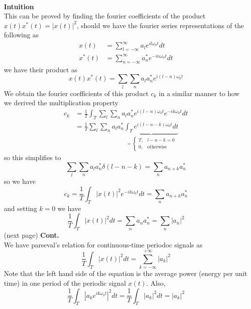 \documentclass{report}
\begin{document}
\vspace{1mm}\\
\textbf{Intuition}\\
This can be proved by finding the fourier coefficients of the product $x(t)x^*(t)=|x(t)|^2$, should we have the fourier series representations of the following as
\begin{align*}
x(t)&=\sum^\infty_{l=-\infty}a_le^{il\omega_0t}dt\\
x^*(t)&=\sum^\infty_{n=-\infty}a^*_ne^{-in\omega_0t}dt
\end{align*}
we have their product as
\begin{equation*}
x(t)x^*(t)=\sum_l\sum_na_la^*_ne^{i(l-n)\omega_0t}
\end{equation*}
We obtain the fourier coefficients of this product $c_k$ in a similar manner to how we derived the multiplication property
\begin{align*}
c_k&=\frac{1}{T}\int_T\sum_l\sum_na_la^*_ne^{i(l-n)\omega_0t}e^{-ik\omega_0t}dt\\
&=\frac{1}{T}\sum_l\sum_na_la^*_n\underbrace{\int_Te^{i(l-n-k)\omega_0t}dt}_{=\begin{cases}
T,&l-n-k=0\\
0,&\text{otherwise}\end{cases}}
\end{align*}
so this simplifies to
\begin{equation*}
\sum_l\sum_na_la^*_n\delta(l-n-k)=\sum_na_{n+k}a^*_n
\end{equation*}
so we have
\begin{equation*}
c_k=\frac{1}{T}\int_T|x(t)|^2e^{-ik\omega_0t}dt=\sum_na_{n+k}a^*_n
\end{equation*}
and setting $k=0$ we have
\begin{equation*}
\frac{1}{T}\int_T|x(t)|^2dt=\sum_na_{n}a^*_n=\sum_n|a_{n}|^2
\end{equation*}
(next page)\newpage
\noindent\textbf{Cont.}\\
We have parseval's relation for continuous-time periodoc signals as
\begin{equation*}
\frac{1}{T}\int_T|x(t)|^2dt=\sum^{+\infty}_{k=-\infty}|a_k|^2
\end{equation*}
Note that the left hand side of the equation is the average power (energy per unit time) in one period of the periodic signal $x(t)$. Also,
\begin{equation*}
\frac{1}{T}\int_T\left|a_ke^{ik\omega_0t}\right|^2dt=\frac{1}{T}\int_T|a_k|^2dt=|a_k|^2
\end{equation*}
\end{document}

